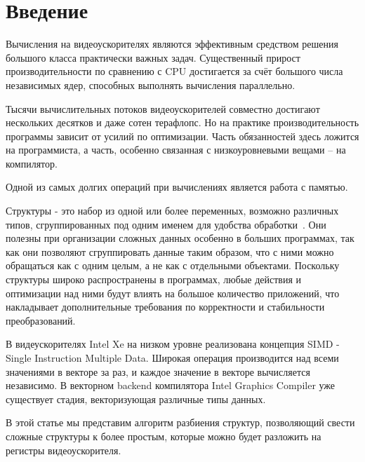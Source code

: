 \section{Введение}
\label{sec:Introduction}
Вычисления на видеоускорителях являются эффективным средством решения большого класса практически важных задач. 
Существенный прирост производительности по сравнению с CPU достигается за счёт большого числа независимых ядер, способных выполнять вычисления параллельно.

Тысячи вычислительных потоков видеоускорителей совместно достигают нескольких десятков и даже сотен терафлопс. Но на практике производительность программы зависит от усилий по оптимизации.
Часть обязанностей здесь ложится на программиста, а часть, особенно связанная с низкоуровневыми вещами -- на компилятор.

Одной из самых долгих операций при вычислениях является работа с памятью. 

Структуры - это набор из одной или более переменных, возможно различных типов, сгруппированных под одним именем для удобства обработки~\cite{Kern}.
Они полезны при организации сложных данных особенно в больших программах, так как они позволяют сгруппировать данные таким образом, что с ними можно обращаться как с одним целым, а не как с отдельными объектами.
Поскольку структуры широко распространены в программах, любые действия и оптимизации над ними будут влиять на большое количество приложений, что накладывает дополнительные требования по корректности и стабильности преобразований.

В видеускорителях Intel Xe на низком уровне реализована концепция SIMD - Single Instruction Multiple Data.
Широкая операция производится над всеми значениями в векторе за раз, и каждое значение в векторе вычисляется независимо.
В векторном backend компилятора Intel Graphics Compiler уже существует стадия, векторизующая различные типы данных.

В этой статье мы представим алгоритм разбиения структур, позволяющий свести сложные структуры к более простым, которые можно будет разложить на регистры видеоускорителя.
